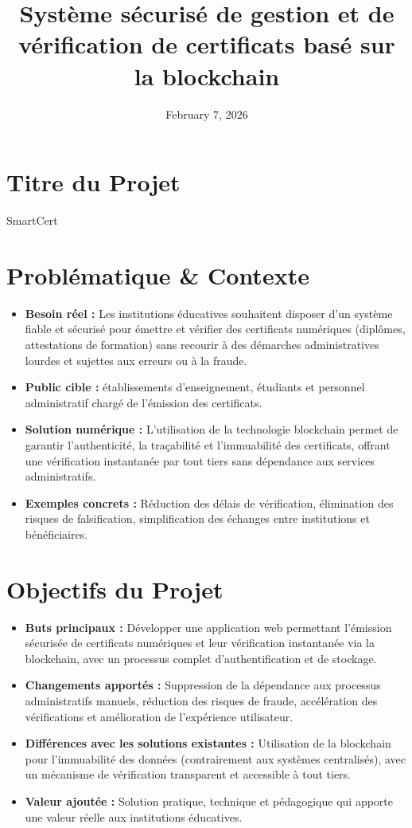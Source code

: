 \documentclass{article}
\title{Système sécurisé de gestion et de vérification de certificats basé sur la blockchain}
\author{}
\date{February 7, 2026}
\begin{document}
\maketitle

\section{Titre du Projet}
SmartCert
\section{Problématique \& Contexte}
\begin{itemize}
    \item \textbf{Besoin réel :} Les institutions éducatives souhaitent disposer d'un système fiable et sécurisé pour émettre et vérifier des certificats numériques (diplômes, attestations de formation) sans recourir à des démarches administratives lourdes et sujettes aux erreurs ou à la fraude.
    \item \textbf{Public cible :} établissements d'enseignement, étudiants et personnel administratif chargé de l'émission des certificats.
    \item \textbf{Solution numérique :} L'utilisation de la technologie blockchain permet de garantir l'authenticité, la traçabilité et l'immuabilité des certificats, offrant une vérification instantanée par tout tiers sans dépendance aux services administratifs.
    \item \textbf{Exemples concrets :} Réduction des délais de vérification, élimination des risques de falsification, simplification des échanges entre institutions et bénéficiaires.
\end{itemize}

\section{Objectifs du Projet}
\begin{itemize}
    \item \textbf{Buts principaux :} Développer une application web permettant l'émission sécurisée de certificats numériques et leur vérification instantanée via la blockchain, avec un processus complet d'authentification et de stockage.
    \item \textbf{Changements apportés :} Suppression de la dépendance aux processus administratifs manuels, réduction des risques de fraude, accélération des vérifications et amélioration de l'expérience      utilisateur.
    \item \textbf{Différences avec les solutions existantes :} Utilisation de la blockchain pour l'immuabilité des données (contrairement aux systèmes centralisés), avec un mécanisme de vérification transparent et accessible à tout tiers.
    \item \textbf{Valeur ajoutée :} Solution pratique, technique et pédagogique qui apporte une valeur réelle aux institutions éducatives.
\end{itemize}
\end{document}
